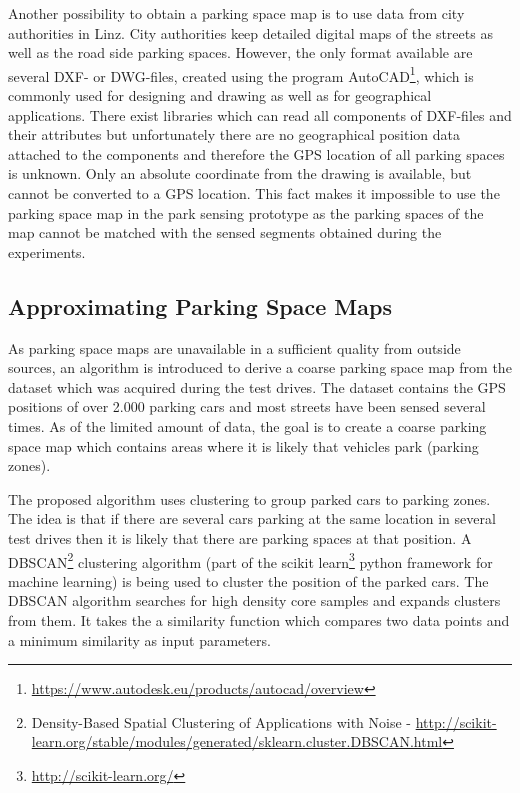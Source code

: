 Another possibility to obtain a parking space map is to use data from city authorities in Linz. City authorities keep detailed digital maps of the streets as well as the road side parking spaces. However, the only format available are several DXF- or DWG-files, created using the program AutoCAD\footnote{\url{https://www.autodesk.eu/products/autocad/overview}}, which is commonly used for designing and drawing as well as for geographical applications. There exist libraries which can read all components of DXF-files and their attributes but unfortunately there are no geographical position data attached to the components and therefore the GPS location of all parking spaces is unknown. Only an absolute coordinate from the drawing is available, but cannot be converted to a GPS location. This fact makes it impossible to use the parking space map in the park sensing prototype as the parking spaces of the map cannot be matched with the sensed segments obtained during the experiments.



\subsection{Approximating Parking Space Maps}
\label{sec:approximating_parking_space_maps}

As parking space maps are unavailable in a sufficient quality from outside sources, an algorithm is introduced to derive a coarse parking space map from the dataset which was acquired during the test drives. The dataset contains the GPS positions of over 2.000 parking cars and most streets have been sensed several times. As of the limited amount of data, the goal is to create a coarse parking space map which contains areas where it is likely that vehicles park (parking zones). 

The proposed algorithm uses clustering to group parked cars to parking zones. The idea is that if there are several cars parking at the same location in several test drives then it is likely that there are parking spaces at that position. A DBSCAN\footnote{Density-Based Spatial Clustering of Applications with Noise - \url{http://scikit-learn.org/stable/modules/generated/sklearn.cluster.DBSCAN.html}} clustering algorithm (part of the scikit learn\footnote{\url{http://scikit-learn.org/}} python framework for machine learning) is being used to cluster the position of the parked cars. The DBSCAN algorithm searches for high density core samples and expands clusters from them. It takes the a similarity function which compares two data points and a minimum similarity as input parameters.

